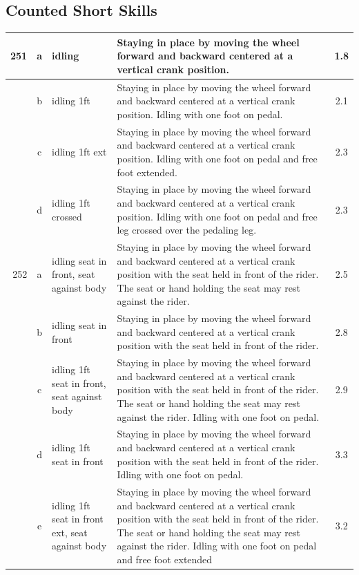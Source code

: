 \subsection{Counted Short Skills}
\begin{longtable}{|r|c|p{4cm}|p{8cm}|c|}
\hline
251 & a & idling  & Staying in place by moving the wheel forward and backward centered at a vertical crank position.  & 1.8 \\ 
\hline
  & b & idling 1ft  & Staying in place by moving the wheel forward and backward centered at a vertical crank position. Idling with one foot on pedal. & 2.1 \\ 
\hline
  & c & idling 1ft ext  & Staying in place by moving the wheel forward and backward centered at a vertical crank position. Idling with one foot on pedal and free foot extended.  & 2.3 \\ 
\hline
  & d & idling 1ft crossed  & Staying in place by moving the wheel forward and backward centered at a vertical crank position. Idling with one foot on pedal and free leg crossed over the pedaling leg.  & 2.3 \\ 
\hline
252 & a & idling seat in front, seat against body & Staying in place by moving the wheel forward and backward centered at a vertical crank position with the seat held in front of the rider. The seat or hand holding the seat may rest against the rider. & 2.5 \\ 
\hline
  & b & idling seat in front  & Staying in place by moving the wheel forward and backward centered at a vertical crank position with the seat held in front of the rider. & 2.8 \\ 
\hline
  & c & idling 1ft seat in front, seat against body & Staying in place by moving the wheel forward and backward centered at a vertical crank position with the seat held in front of the rider. The seat or hand holding the seat may rest against the rider. Idling with one foot on pedal.  & 2.9 \\ 
\hline
  & d & idling 1ft seat in front  & Staying in place by moving the wheel forward and backward centered at a vertical crank position with the seat held in front of the rider. Idling with one foot on pedal.  & 3.3 \\ 
\hline
  & e & idling 1ft seat in front ext, seat against body & Staying in place by moving the wheel forward and backward centered at a vertical crank position with the seat held in front of the rider. The seat or hand holding the seat may rest against the rider. Idling with one foot on pedal and free foot extended  & 3.2 \\ 

\end{longtable}
